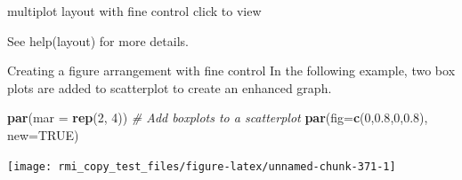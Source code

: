 \documentclass[]{book}
\newenvironment{Shaded}{\begin{snugshade}}{\end{snugshade}}
\newcommand{\KeywordTok}[1]{\textcolor[rgb]{0.13,0.29,0.53}{\textbf{#1}}}
\newcommand{\DataTypeTok}[1]{\textcolor[rgb]{0.13,0.29,0.53}{#1}}
\newcommand{\DecValTok}[1]{\textcolor[rgb]{0.00,0.00,0.81}{#1}}
\newcommand{\FloatTok}[1]{\textcolor[rgb]{0.00,0.00,0.81}{#1}}
\newcommand{\StringTok}[1]{\textcolor[rgb]{0.31,0.60,0.02}{#1}}
\newcommand{\CommentTok}[1]{\textcolor[rgb]{0.56,0.35,0.01}{\textit{#1}}}
\newcommand{\OtherTok}[1]{\textcolor[rgb]{0.56,0.35,0.01}{#1}}
\newcommand{\OperatorTok}[1]{\textcolor[rgb]{0.81,0.36,0.00}{\textbf{#1}}}
\newcommand{\NormalTok}[1]{#1}
\theoremstyle{definition}
\theoremstyle{definition}
\theoremstyle{definition}
\theoremstyle{remark}
\begin{document}
multiplot layout with fine control click to view

See help(layout) for more details.

Creating a figure arrangement with fine control In the following
example, two box plots are added to scatterplot to create an enhanced
graph.

\begin{Shaded}
\begin{Highlighting}[]
\KeywordTok{par}\NormalTok{(}\DataTypeTok{mar =} \KeywordTok{rep}\NormalTok{(}\DecValTok{2}\NormalTok{, }\DecValTok{4}\NormalTok{)) }
\CommentTok{# Add boxplots to a scatterplot}
\KeywordTok{par}\NormalTok{(}\DataTypeTok{fig=}\KeywordTok{c}\NormalTok{(}\DecValTok{0}\NormalTok{,}\FloatTok{0.8}\NormalTok{,}\DecValTok{0}\NormalTok{,}\FloatTok{0.8}\NormalTok{), }\DataTypeTok{new=}\OtherTok{TRUE}\NormalTok{)}
\end{Highlighting}
\end{Shaded}

\begin{Shaded}
\end{Shaded}

\begin{center}\texttt{[image: rmi\_copy\_test\_files/figure-latex/unnamed-chunk-371-1]} \end{center}
\end{document}
